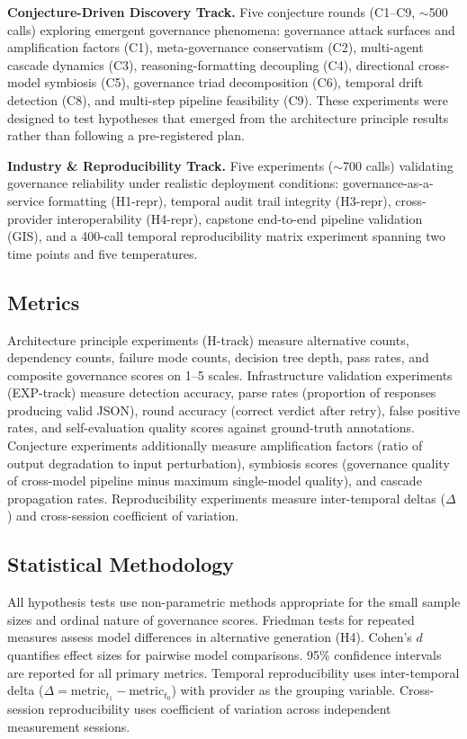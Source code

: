 \documentclass[11pt,a4paper]{article}
\begin{document}
\textbf{Conjecture-Driven Discovery Track.} Five conjecture rounds (C1--C9, $\sim$500 calls) exploring emergent governance phenomena: governance attack surfaces and amplification factors (C1), meta-governance conservatism (C2), multi-agent cascade dynamics (C3), reasoning-formatting decoupling (C4), directional cross-model symbiosis (C5), governance triad decomposition (C6), temporal drift detection (C8), and multi-step pipeline feasibility (C9). These experiments were designed to test hypotheses that emerged from the architecture principle results rather than following a pre-registered plan.

\textbf{Industry \& Reproducibility Track.} Five experiments ($\sim$700 calls) validating governance reliability under realistic deployment conditions: governance-as-a-service formatting (H1-repr), temporal audit trail integrity (H3-repr), cross-provider interoperability (H4-repr), capstone end-to-end pipeline validation (GIS), and a 400-call temporal reproducibility matrix experiment spanning two time points and five temperatures.

\subsection{Metrics}

Architecture principle experiments (H-track) measure alternative counts, dependency counts, failure mode counts, decision tree depth, pass rates, and composite governance scores on 1--5 scales. Infrastructure validation experiments (EXP-track) measure detection accuracy, parse rates (proportion of responses producing valid JSON), round accuracy (correct verdict after retry), false positive rates, and self-evaluation quality scores against ground-truth annotations. Conjecture experiments additionally measure amplification factors (ratio of output degradation to input perturbation), symbiosis scores (governance quality of cross-model pipeline minus maximum single-model quality), and cascade propagation rates. Reproducibility experiments measure inter-temporal deltas ($\Delta$) and cross-session coefficient of variation.

\subsection{Statistical Methodology}

All hypothesis tests use non-parametric methods appropriate for the small sample sizes and ordinal nature of governance scores. Friedman tests for repeated measures assess model differences in alternative generation (H4). Cohen's $d$ quantifies effect sizes for pairwise model comparisons. 95\% confidence intervals are reported for all primary metrics. Temporal reproducibility uses inter-temporal delta ($\Delta = \text{metric}_{t_1} - \text{metric}_{t_0}$) with provider as the grouping variable. Cross-session reproducibility uses coefficient of variation across independent measurement sessions.
\end{document}
